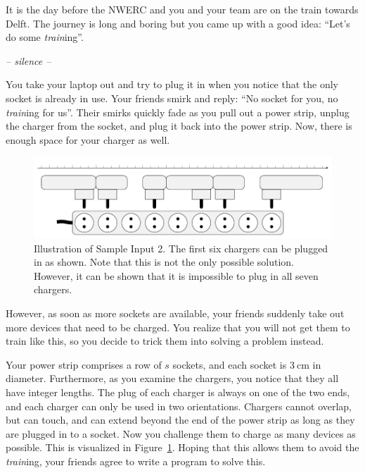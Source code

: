 \problemname{\problemyamlname}
It is the day before the NWERC and you and your team are on the train towards Delft.
The journey is long and boring but you came up with a good idea: ``Let's do some \emph{train}ing''.

\quad\emph{-- silence --}

You take your laptop out and try to plug it in when you notice that the only socket is already in use.
Your friends smirk and reply: ``No socket for you, no \emph{train}ing for us''.
Their smirks quickly fade as you pull out a power strip, unplug the charger from the socket, and plug it back into the power strip.
Now, there is enough space for your charger as well.


\begin{figure}[h]
    \centering
    \includegraphics{powerstrip.pdf}
    \caption{
        Illustration of Sample Input 2.
        The first six chargers can be plugged in as shown.
        Note that this is not the only possible solution.
        However, it can be shown that it is impossible to plug in all seven chargers.
    }
    \label{fig:powerstrip}
\end{figure}

However, as soon as more sockets are available, your friends suddenly take out more devices that need to be charged.
You realize that you will not get them to train like this, so you decide to trick them into solving a problem instead.

Your power strip comprises a row of $s$ sockets, and each socket is $\SI{3}{\cm}$ in diameter.
Furthermore, as you examine the chargers, you notice that they all have integer lengths.
The plug of each charger is always on one of the two ends, and each charger can
only be used in two orientations. Chargers cannot overlap, but can touch,
and can extend beyond the end of the power strip as long as they are plugged in
to a socket.
Now you challenge them to charge as many devices as possible.
This is visualized in Figure~\ref{fig:powerstrip}.
Hoping that this allows them to avoid the \emph{train}ing, your friends agree to write a program to solve this.

